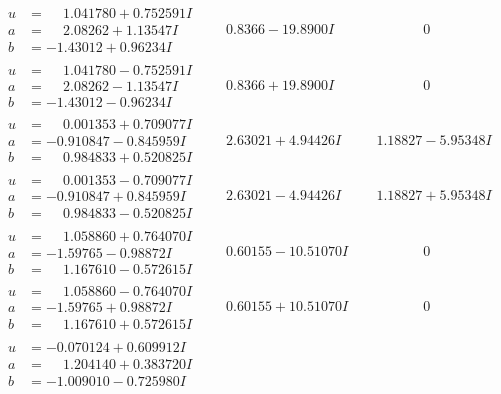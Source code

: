 \documentclass[1p]{elsarticle_modified}
\theoremstyle{definition}
\begin{document}
$$\begin{array}{c|c|c}
\begin{aligned}
u &= \phantom{-}1.041780 + 0.752591 I \\
a &= \phantom{-}2.08262 + 1.13547 I \\
b &= -1.43012 + 0.96234 I\end{aligned}
 & \phantom{-}0.8366 - 19.8900 I & \phantom{-0.000000 } 0 \\ \hline\begin{aligned}
u &= \phantom{-}1.041780 - 0.752591 I \\
a &= \phantom{-}2.08262 - 1.13547 I \\
b &= -1.43012 - 0.96234 I\end{aligned}
 & \phantom{-}0.8366 + 19.8900 I & \phantom{-0.000000 } 0 \\ \hline\begin{aligned}
u &= \phantom{-}0.001353 + 0.709077 I \\
a &= -0.910847 - 0.845959 I \\
b &= \phantom{-}0.984833 + 0.520825 I\end{aligned}
 & \phantom{-}2.63021 + 4.94426 I & \phantom{-}1.18827 - 5.95348 I \\ \hline\begin{aligned}
u &= \phantom{-}0.001353 - 0.709077 I \\
a &= -0.910847 + 0.845959 I \\
b &= \phantom{-}0.984833 - 0.520825 I\end{aligned}
 & \phantom{-}2.63021 - 4.94426 I & \phantom{-}1.18827 + 5.95348 I \\ \hline\begin{aligned}
u &= \phantom{-}1.058860 + 0.764070 I \\
a &= -1.59765 - 0.98872 I \\
b &= \phantom{-}1.167610 - 0.572615 I\end{aligned}
 & \phantom{-}0.60155 - 10.51070 I & \phantom{-0.000000 } 0 \\ \hline\begin{aligned}
u &= \phantom{-}1.058860 - 0.764070 I \\
a &= -1.59765 + 0.98872 I \\
b &= \phantom{-}1.167610 + 0.572615 I\end{aligned}
 & \phantom{-}0.60155 + 10.51070 I & \phantom{-0.000000 } 0 \\ \hline\begin{aligned}
u &= -0.070124 + 0.609912 I \\
a &= \phantom{-}1.204140 + 0.383720 I \\
b &= -1.009010 - 0.725980 I\end{aligned}

\end{array}$$
\end{document}
